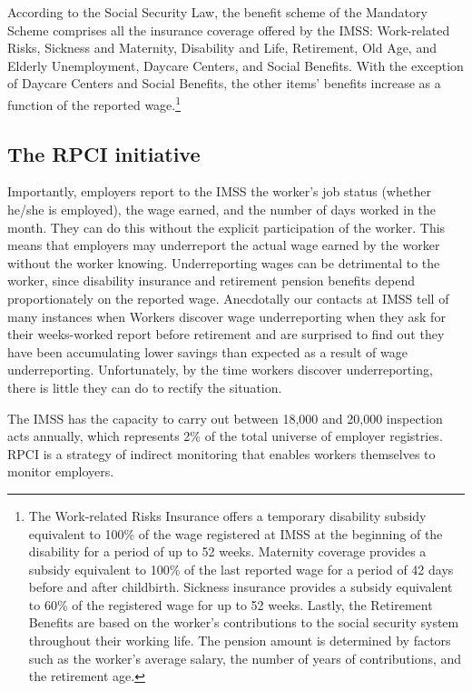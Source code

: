 \documentclass[oneside,11pt]{article}
\begin{document}
According to the Social Security Law, the benefit scheme of the Mandatory Scheme comprises all the insurance coverage offered by the IMSS: Work-related Risks, Sickness and Maternity, Disability and Life, Retirement, Old Age, and Elderly Unemployment, Daycare Centers, and Social Benefits.
With the exception of Daycare Centers and Social Benefits, the other items' benefits increase as a function of the reported wage.\footnote{The Work-related Risks Insurance offers a temporary disability subsidy equivalent to 100\% of the wage registered at IMSS at the beginning of the disability for a period of up to 52 weeks. Maternity coverage provides a subsidy equivalent to 100\% of the last reported wage for a period of 42 days before and after childbirth. Sickness insurance provides a subsidy equivalent to 60\% of the registered wage for up to 52 weeks. Lastly, the Retirement Benefits are based on the worker's contributions to the social security system throughout their working life. The pension amount is determined by factors such as the worker's average salary, the number of years of contributions, and the retirement age.}  


\subsection{The RPCI initiative}

Importantly, employers report to the IMSS the worker's job status (whether he/she is employed), the wage earned, and the number of days worked in the month. They can do this without the explicit participation of the worker. This means that employers may underreport the actual wage earned by the worker without the worker knowing. Underreporting wages can be detrimental to the worker, since disability insurance and retirement pension benefits depend proportionately on the reported wage. Anecdotally our contacts at IMSS tell of many instances when Workers discover wage underreporting when they ask for their weeks-worked report before retirement and are surprised to find out they have been accumulating lower savings than expected as a result of wage underreporting.  Unfortunately, by the time workers discover underreporting, there is little they can do to rectify the situation. 

The IMSS has the capacity to carry out between 18,000 and 20,000 inspection acts annually, which represents 2\% of the total universe of employer registries. RPCI is a strategy of indirect monitoring that enables workers themselves to monitor employers.
\end{document}
